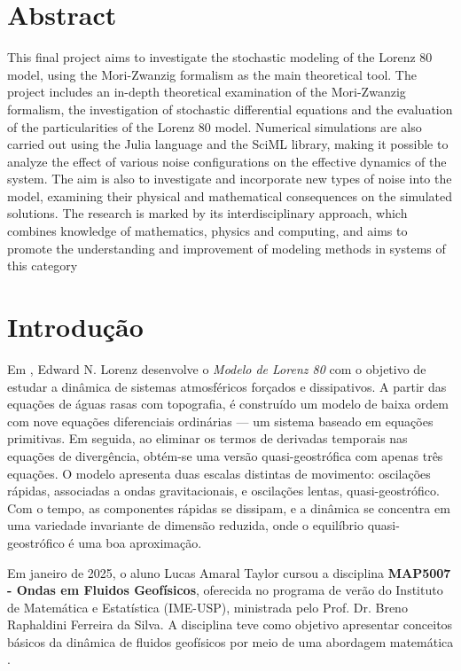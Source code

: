 \documentclass[12pt]{article}
\begin{document}
\section*{Abstract}
This final project aims to investigate the stochastic modeling of the Lorenz 80 model, using the Mori-Zwanzig formalism as the main theoretical tool.  The project includes an in-depth theoretical examination of the Mori-Zwanzig formalism, the investigation of stochastic differential equations and the evaluation of the particularities of the Lorenz 80 model.  Numerical simulations are also carried out using the Julia language and the SciML library, making it possible to analyze the effect of various noise configurations on the effective dynamics of the system.  The aim is also to investigate and incorporate new types of noise into the model, examining their physical and mathematical consequences on the simulated solutions.  The research is marked by its interdisciplinary approach, which combines knowledge of mathematics, physics and computing, and aims to promote the understanding and improvement of modeling methods in systems of this category

\newpage

\section*{Introdução}
    Em \citet{Lorenz1980}, Edward N. Lorenz desenvolve o \textit{Modelo de Lorenz 80} com o objetivo de estudar a dinâmica de sistemas atmosféricos forçados e dissipativos. A partir das equações de águas rasas com topografia, é construído um modelo de baixa ordem com nove equações diferenciais ordinárias — um sistema baseado em equações primitivas. Em seguida, ao eliminar os termos de derivadas temporais nas equações de divergência, obtém-se uma versão quasi-geostrófica com apenas três equações. O modelo apresenta duas escalas distintas de movimento: oscilações rápidas, associadas a ondas gravitacionais, e oscilações lentas, quasi-geostrófico. Com o tempo, as componentes rápidas se dissipam, e a dinâmica se concentra em uma variedade invariante de dimensão reduzida, onde o equilíbrio quasi-geostrófico é uma boa aproximação.
    
    Em janeiro de 2025, o aluno Lucas Amaral Taylor cursou a disciplina \textbf{MAP5007 - Ondas em Fluidos Geofísicos}, oferecida no programa de verão do Instituto de Matemática e Estatística (IME-USP), ministrada pelo Prof. Dr. Breno Raphaldini Ferreira da Silva. A disciplina teve como objetivo apresentar conceitos básicos da dinâmica de fluidos geofísicos por meio de uma abordagem matemática \citep{uspJanus}.
    
\end{document}
